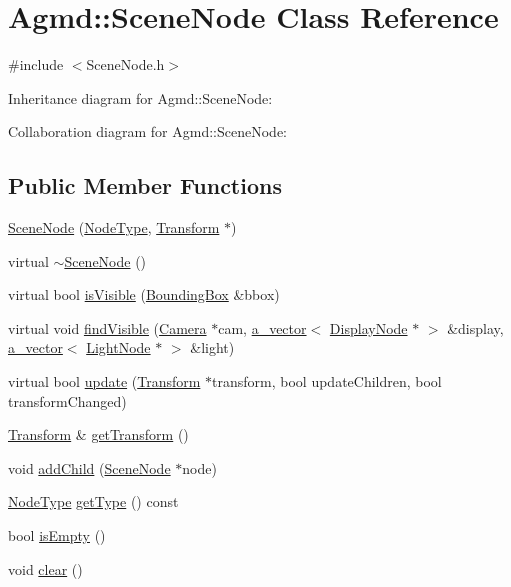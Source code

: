 \hypertarget{class_agmd_1_1_scene_node}{\section{Agmd\+:\+:Scene\+Node Class Reference}
\label{class_agmd_1_1_scene_node}
}


{\ttfamily \#include $<$Scene\+Node.\+h$>$}



Inheritance diagram for Agmd\+:\+:Scene\+Node\+:


Collaboration diagram for Agmd\+:\+:Scene\+Node\+:
\subsection*{Public Member Functions}
\begin{DoxyCompactItemize}
\item 
\hyperlink{class_agmd_1_1_scene_node_a1c1f053d797d8e8a6ba88ce5a83255ed}{Scene\+Node} (\hyperlink{namespace_agmd_aab017255de32f494c1e7330b4ad7e945}{Node\+Type}, \hyperlink{class_agmd_maths_1_1_transform}{Transform} $\ast$)
\item 
virtual \hyperlink{class_agmd_1_1_scene_node_a10621f9021041f93f137e7c1edd2a8bb}{$\sim$\+Scene\+Node} ()
\item 
virtual bool \hyperlink{class_agmd_1_1_scene_node_ae523c967aa9d24bc8b66db43e84f0c5f}{is\+Visible} (\hyperlink{class_agmd_1_1_bounding_box}{Bounding\+Box} \&bbox)
\item 
virtual void \hyperlink{class_agmd_1_1_scene_node_a7cae5ee1b73f40e074f4ac86be4b694a}{find\+Visible} (\hyperlink{class_agmd_1_1_camera}{Camera} $\ast$cam, \hyperlink{_vector_8h_a3df82cea60ff4ad0acb44e58454406a5}{a\+\_\+vector}$<$ \hyperlink{class_agmd_1_1_display_node}{Display\+Node} $\ast$ $>$ \&display, \hyperlink{_vector_8h_a3df82cea60ff4ad0acb44e58454406a5}{a\+\_\+vector}$<$ \hyperlink{class_agmd_1_1_light_node}{Light\+Node} $\ast$ $>$ \&light)
\item 
virtual bool \hyperlink{class_agmd_1_1_scene_node_a8ee2002fe5b30368f272d31ce0213d2e}{update} (\hyperlink{class_agmd_maths_1_1_transform}{Transform} $\ast$transform, bool update\+Children, bool transform\+Changed)
\item 
\hyperlink{class_agmd_maths_1_1_transform}{Transform} \& \hyperlink{class_agmd_1_1_scene_node_ab45325e60dec6187293000b3d3e5bbef}{get\+Transform} ()
\item 
void \hyperlink{class_agmd_1_1_scene_node_a018339cbc213ce125319ddc996671efd}{add\+Child} (\hyperlink{class_agmd_1_1_scene_node}{Scene\+Node} $\ast$node)
\item 
\hyperlink{namespace_agmd_aab017255de32f494c1e7330b4ad7e945}{Node\+Type} \hyperlink{class_agmd_1_1_scene_node_aa239f52109ebd0ab1678038ab549ee71}{get\+Type} () const 
\item 
bool \hyperlink{class_agmd_1_1_scene_node_a424dd9ef137707cd9ec54bd05a72a31d}{is\+Empty} ()
\item 
void \hyperlink{class_agmd_1_1_scene_node_a8f81da4424e248ccfa3896247aa27883}{clear} ()
\end{DoxyCompactItemize}
